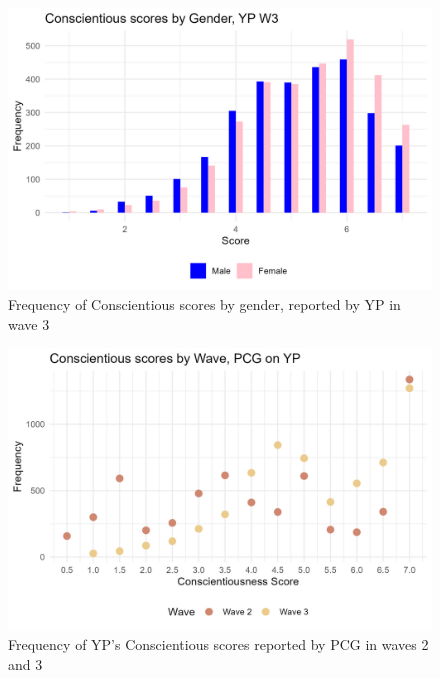 \documentclass[a4paper]{article}
\begin{document}
\begin{figure}[htbp] 
    \centering
    \includegraphics[width=1\linewidth]{Frequency of Conscientious by Gender.jpeg}
    \caption{Frequency of Conscientious scores by gender, reported by YP in wave 3}
    \label{}
\end{figure}

\begin{figure}[htbp] 
    \centering
    \includegraphics[width=1\linewidth]{Frequency of Conscientious by Wave, PCG.jpeg}
    \caption{Frequency of YP's Conscientious scores reported by PCG in waves 2 and 3}
    \label{}
\end{figure}
\end{document}
